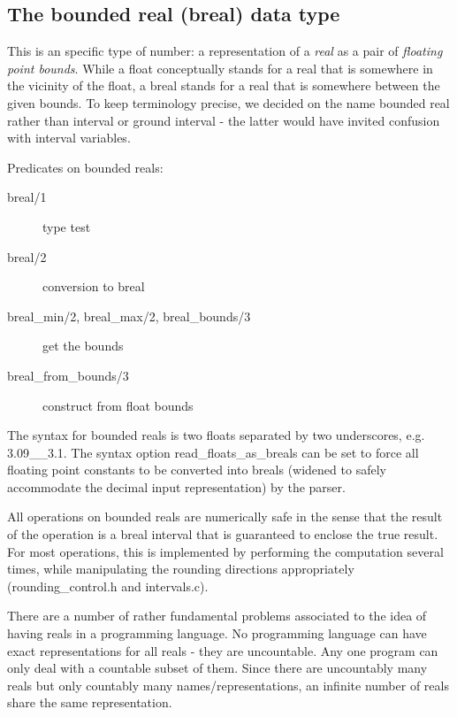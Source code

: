 \subsection{The bounded real (breal) data type}
This is an {\eclipse} specific type of number: a representation of a {\em real}
as a pair of {\em floating point bounds}. While a float conceptually
stands for a real that is somewhere in the vicinity of the float,
a breal stands for a real that is somewhere between the given bounds.
To keep terminology precise, we decided on the name bounded real
rather than interval or ground interval - the latter would
have invited confusion with interval variables.

Predicates on bounded reals:
\begin{description}
\item[breal/1]  type test
\item[breal/2]  conversion to breal
\item[breal_min/2, breal_max/2, breal_bounds/3] get the bounds
\item[breal_from_bounds/3] construct from float bounds
\end{description}
The syntax for bounded reals is two floats separated by two underscores,
e.g. 3.09__3.1.
The syntax option read_floats_as_breals can be set to force all floating point
constants to be converted into breals (widened to safely accommodate the
decimal input representation) by the parser.

All operations on bounded reals are numerically safe in the sense that
the result of the operation is a breal interval that is guaranteed to
enclose the true result. For most operations, this is implemented by
performing the computation several times, while manipulating the
rounding directions appropriately (rounding_control.h
and intervals.c).

There are a number of rather fundamental problems associated to the idea
of having reals in a programming language.  No
programming language can have exact representations for all reals -
they are uncountable.  Any one program can only deal with a countable
subset of them.  Since there are uncountably many reals but only
countably many names/representations, an infinite number of reals
share the same representation.

